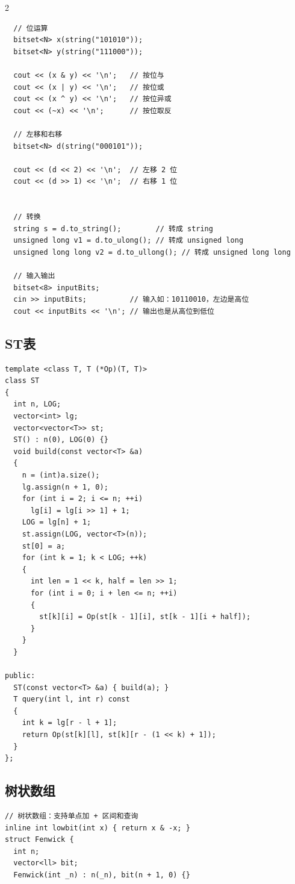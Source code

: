 \documentclass[10pt]{article}
\begin{document}
\begin{multicols*}{2}
\begin{verbatim}
  // 位运算
  bitset<N> x(string("101010"));
  bitset<N> y(string("111000"));

  cout << (x & y) << '\n';   // 按位与
  cout << (x | y) << '\n';   // 按位或
  cout << (x ^ y) << '\n';   // 按位异或
  cout << (~x) << '\n';      // 按位取反

  // 左移和右移
  bitset<N> d(string("000101"));

  cout << (d << 2) << '\n';  // 左移 2 位
  cout << (d >> 1) << '\n';  // 右移 1 位


  // 转换
  string s = d.to_string();        // 转成 string
  unsigned long v1 = d.to_ulong(); // 转成 unsigned long
  unsigned long long v2 = d.to_ullong(); // 转成 unsigned long long

  // 输入输出
  bitset<8> inputBits;
  cin >> inputBits;          // 输入如：10110010，左边是高位
  cout << inputBits << '\n'; // 输出也是从高位到低位
\end{verbatim}




\subsection{ST表}


\begin{verbatim}
template <class T, T (*Op)(T, T)>
class ST
{
  int n, LOG;
  vector<int> lg;
  vector<vector<T>> st;
  ST() : n(0), LOG(0) {}
  void build(const vector<T> &a)
  {
    n = (int)a.size();
    lg.assign(n + 1, 0);
    for (int i = 2; i <= n; ++i)
      lg[i] = lg[i >> 1] + 1;
    LOG = lg[n] + 1;
    st.assign(LOG, vector<T>(n));
    st[0] = a;
    for (int k = 1; k < LOG; ++k)
    {
      int len = 1 << k, half = len >> 1;
      for (int i = 0; i + len <= n; ++i)
      {
        st[k][i] = Op(st[k - 1][i], st[k - 1][i + half]);
      }
    }
  }

public:
  ST(const vector<T> &a) { build(a); }
  T query(int l, int r) const
  {
    int k = lg[r - l + 1];
    return Op(st[k][l], st[k][r - (1 << k) + 1]);
  }
};
\end{verbatim}




\subsection{树状数组}


\begin{verbatim}
// 树状数组：支持单点加 + 区间和查询
inline int lowbit(int x) { return x & -x; }
struct Fenwick {
  int n;
  vector<ll> bit;
  Fenwick(int _n) : n(_n), bit(n + 1, 0) {}



\end{verbatim}
\end{multicols*}
\end{document}
